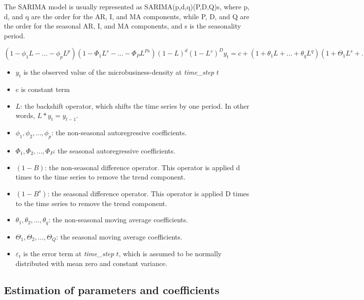 \documentclass{article}
\begin{document}
\vspace{1em}
The SARIMA model is usually represented as SARIMA(p,d,q)(P,D,Q)s, where p, d,
and q are the order for the AR, I, and MA components, while P, D, and Q are the order for the seasonal AR, I, and MA components, and s is the seasonality period.


\vspace{1em}
\begin{center}
	\begin{tcolorbox}[colframe=orange,boxsep=5pt,boxrule=1pt,colback=white, width=1.1\linewidth]
		$
		(1 - \phi_1 L  - ... - \phi_p L^p)(1 - \Phi_1 L^s - ... - \Phi_P L^{Ps})(1 - L)^d (1 - L^s)^Dy_t = c + (1 + \theta_1 L + ... + \theta_q L^q)(1 + \Theta_1 L^s +  ... + \Theta_Q L^{Qs})\varepsilon_t		$
	\end{tcolorbox}
\end{center}

\vspace{1em}
\begin{itemize}
	\item $y_t$ is the observed value of the microbusiness-density at \textit{time\_step} $t$
	\item c is constant term
	\item $L$: the backshift operator, which shifts the time series by one period. In other words, $L*y_t = y_{t-1}$.
	\item $\phi_1, \phi_2, ..., \phi_p$: the non-seasonal autoregressive coefficients. 
	\item $\Phi_1, \Phi_2, ..., \Phi_P$: the seasonal autoregressive coefficients. 
	\item $(1-B)$: the non-seasonal difference operator. This operator is applied d times to the time series to remove the trend component.
	\item $(1-B^s)$: the seasonal difference operator. This operator is applied D times to the time series to remove the trend component.
	\item $\theta_1, \theta_2, ..., \theta_q$: the non-seasonal moving average coefficients. 
	\item $\Theta_1, \Theta_2, ..., \Theta_Q$: the seasonal moving average coefficients.
	\item $\varepsilon_t$ is the error term at \textit{time\_step} $t$,  which is assumed to be normally distributed with mean zero and constant variance.
\end{itemize}

\subsection{Estimation of parameters and coefficients}
\end{document}
